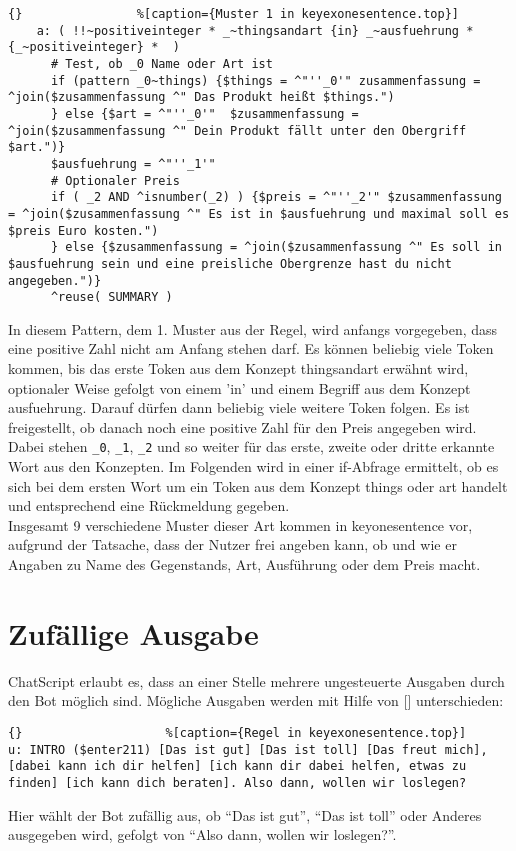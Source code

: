 \begin{lstlisting}{}				%[caption={Muster 1 in keyexonesentence.top}]
    a: ( !!~positiveinteger * _~thingsandart {in} _~ausfuehrung * {_~positiveinteger} *  )
      # Test, ob _0 Name oder Art ist
      if (pattern _0~things) {$things = ^"''_0'" zusammenfassung = ^join($zusammenfassung ^" Das Produkt heißt $things.")
      } else {$art = ^"''_0'"  $zusammenfassung = ^join($zusammenfassung ^" Dein Produkt fällt unter den Obergriff $art.")}
      $ausfuehrung = ^"''_1'"
      # Optionaler Preis
      if ( _2 AND ^isnumber(_2) ) {$preis = ^"''_2'" $zusammenfassung = ^join($zusammenfassung ^" Es ist in $ausfuehrung und maximal soll es $preis Euro kosten.")
      } else {$zusammenfassung = ^join($zusammenfassung ^" Es soll in $ausfuehrung sein und eine preisliche Obergrenze hast du nicht angegeben.")}
      ^reuse( SUMMARY )
\end{lstlisting}
        
In diesem Pattern, dem 1. Muster aus der Regel, wird anfangs vorgegeben, dass eine positive Zahl nicht am Anfang stehen darf. Es können beliebig viele Token kommen, bis das erste Token aus dem Konzept \texttildelow thingsandart erwähnt wird, optionaler Weise gefolgt von einem 'in' und einem Begriff aus dem Konzept \texttildelow ausfuehrung. Darauf dürfen dann beliebig viele weitere Token folgen. Es ist freigestellt, ob danach noch eine positive Zahl für den Preis angegeben wird.\\
Dabei stehen \lstinline|_0|, \lstinline|_1|, \lstinline|_2| und so weiter für das erste, zweite oder dritte erkannte Wort aus den Konzepten. Im Folgenden wird in einer if-Abfrage ermittelt, ob es sich bei dem ersten Wort um ein Token aus dem Konzept \texttildelow things oder \texttildelow art handelt und entsprechend eine Rückmeldung gegeben.\\ 
Insgesamt 9 verschiedene Muster dieser Art kommen in keyonesentence vor, aufgrund der Tatsache, dass der Nutzer frei angeben kann, ob und wie er Angaben zu Name des Gegenstands, Art, Ausführung oder dem Preis macht.\\


\section{Zufällige Ausgabe}
\label{sec:ChatScript: Zufällige Ausgabe}

ChatScript erlaubt es, dass an einer Stelle mehrere ungesteuerte Ausgaben durch den Bot möglich sind. Mögliche Ausgaben werden mit Hilfe von [] unterschieden:

\begin{lstlisting}{}					%[caption={Regel in keyexonesentence.top}]
u: INTRO ($enter211) [Das ist gut] [Das ist toll] [Das freut mich], [dabei kann ich dir helfen] [ich kann dir dabei helfen, etwas zu finden] [ich kann dich beraten]. Also dann, wollen wir loslegen?
\end{lstlisting}

Hier wählt der Bot zufällig aus, ob "`Das ist gut"', "`Das ist toll"' oder Anderes ausgegeben wird, gefolgt von "`Also dann, wollen wir loslegen?"'.